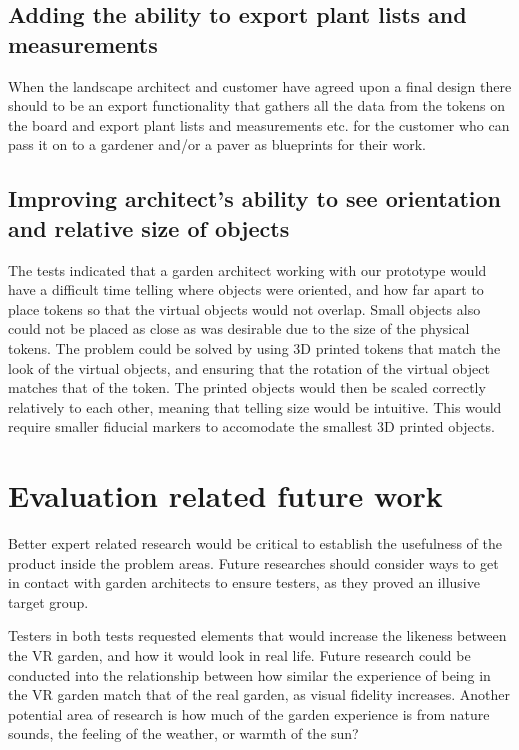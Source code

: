 \subsection*{Adding the ability to export plant lists and measurements}
When the landscape architect and customer have agreed upon a final design there should to be an export functionality that gathers all the data from the tokens on the board and export plant lists and measurements etc. for the customer who can pass it on to a gardener and/or a paver as blueprints for their work.

\subsection*{Improving architect's ability to see orientation and relative size of objects}
The tests indicated that a garden architect working with our prototype would have a difficult time telling where objects were oriented, and how far apart to place tokens so that the virtual objects would not overlap. Small objects also could not be placed as close as was desirable due to the size of the physical tokens. The problem could be solved by using 3D printed tokens that match the look of the virtual objects, and ensuring that the rotation of the virtual object matches that of the token. The printed objects would then be scaled correctly relatively to each other, meaning that telling size would be intuitive. This would require smaller fiducial markers to accomodate the smallest 3D printed objects.

\section{Evaluation related future work}

Better expert related research would be critical to establish the usefulness of the product inside the problem areas. Future researches should consider ways to get in contact with garden architects to ensure testers, as they proved an illusive target group.

Testers in both tests requested elements that would increase the likeness between the VR garden, and how it would look in real life. Future research could be conducted into the relationship between how similar the experience of being in the VR garden match that of the real garden, as visual fidelity increases. Another potential area of research is how much of the garden experience is from nature sounds, the feeling of the weather, or warmth of the sun?

